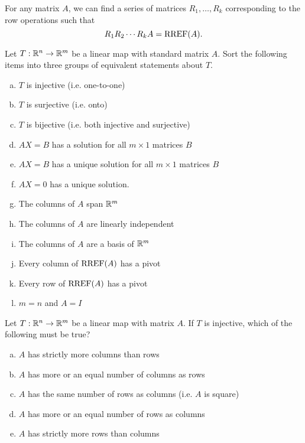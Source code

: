 \begin{applicationActivities}{2}{22}
\begin{observation}
For any matrix $A$, we can find a series of matrices $R_1, \ldots, R_k$ corresponding to the row operations such that $$R_1 R_2 \cdots R_k A = \operatorname{RREF}(A).$$
\end{observation}


\begin{activity}{15}
Let $T: \mathbb{R}^n \rightarrow \mathbb{R}^m$ be a linear map with standard matrix $A$.
Sort the following items into three groups of equivalent statements about $T$.
\begin{multicols}{2}
\begin{enumerate}[(a)]
\item $T$ is injective (i.e. one-to-one)
\item $T$ is surjective (i.e. onto)
\item $T$ is bijective (i.e. both injective and surjective)
\item $AX=B$ has a solution for all $m \times 1$ matrices $B$
\item $AX=B$ has a unique solution for all $m \times 1$ matrices $B$
\item $AX=0$ has a unique solution.
\item The columns of $A$ span $\mathbb{R}^m$
\item The columns of $A$ are linearly independent
\item The columns of $A$ are a basis of $\mathbb{R}^m$
\item Every column of $\operatorname{RREF}(A)$ has a pivot
\item Every row of $\operatorname{RREF}(A)$ has a pivot
\item $m=n$ and $A=I$
\end{enumerate}
\end{multicols}
\end{activity}

\begin{activity}{5}
Let $T: \mathbb{R}^n \rightarrow \mathbb{R}^m$ be a linear map with matrix $A$.
If $T$ is injective, which of the following must be true?
\begin{enumerate}[(a)]
\item $A$ has strictly more columns than rows
\item $A$ has more or an equal number of columns as rows
\item $A$ has the same number of rows as columns (i.e. $A$ is square)
\item $A$ has more or an equal number of rows as columns
\item $A$ has strictly more rows than columns
\end{enumerate}
\end{activity}


\end{applicationActivities}
